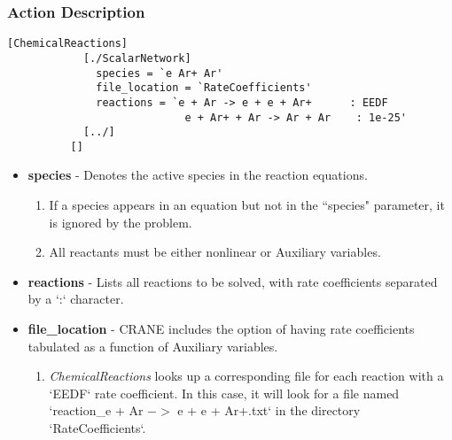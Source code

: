 	\begin{frame}[fragile]
		\frametitle{Action Description}
		\begin{Verbatim}[fontsize=\tiny]
          [ChemicalReactions]
            [./ScalarNetwork]
              species = `e Ar+ Ar'
              file_location = `RateCoefficients'
              reactions = `e + Ar -> e + e + Ar+      : EEDF
                            e + Ar+ + Ar -> Ar + Ar    : 1e-25'
            [../]
          []
		\end{Verbatim}
		\vspace{-1em}
			\begin{itemize}
				\item {\footnotesize \textbf{species} - Denotes the active species in the reaction equations.}
				\begin{enumerate}
					\item {\scriptsize If a species appears in an equation but not in the ``species" parameter, it is ignored by the problem.}
					\item {\scriptsize All reactants must be either nonlinear or Auxiliary variables.}
				\end{enumerate}
				\item {\footnotesize \textbf{reactions} - Lists all reactions to be solved, with rate coefficients separated by a `:` character.}
				\item {\footnotesize \textbf{file\_location} - CRANE includes the option of having rate coefficients tabulated as a function of Auxiliary variables.}
				\begin{enumerate}
					\item {\scriptsize \textit{ChemicalReactions} looks up a corresponding file for each reaction with a `EEDF` rate coefficient. In this case, it will look for a file named `reaction\_e + Ar $->$ e + e + Ar+.txt` in the directory `RateCoefficients`.}
				\end{enumerate}
			\end{itemize}
	\end{frame}

